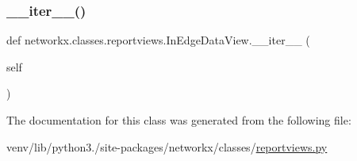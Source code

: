 \mbox{\label{classnetworkx_1_1classes_1_1reportviews_1_1InEdgeDataView_aadae32c2d678955aa4abdcacdfb59eab}} 
\subsubsection{\texorpdfstring{\+\_\+\+\_\+iter\+\_\+\+\_\+()}{\_\_iter\_\_()}}
{\footnotesize\ttfamily def networkx.\+classes.\+reportviews.\+In\+Edge\+Data\+View.\+\_\+\+\_\+iter\+\_\+\+\_\+ (\begin{DoxyParamCaption}\item[{}]{self }\end{DoxyParamCaption})}



The documentation for this class was generated from the following file\+:\begin{DoxyCompactItemize}
\item 
venv/lib/python3./site-\/packages/networkx/classes/\hyperlink{reportviews_8py}{reportviews.\+py}\end{DoxyCompactItemize}
